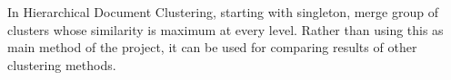 In Hierarchical Document Clustering, starting with singleton,  merge group of clusters whose similarity is maximum at every level. Rather than using this as main method of the project, it can be used for comparing results of other clustering methods.